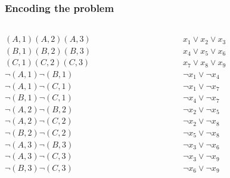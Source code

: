 \documentclass{beamer}
\begin{document}
\begin{frame}
\frametitle{Encoding the problem}
\begin{columns}
	\begin{column}{0.1\textwidth}
		\small
	$(A,1) (A,2) (A,3)$\\
	$(B,1) (B,2) (B,3)$\\
	$(C,1) (C,2) (C,3)$\\
	\vspace{1em}
	$ \neg (A,1)  \neg (B,1)$\\
	$ \neg (A,1)  \neg (C,1)$\\
	$ \neg (B,1)  \neg (C,1)$\\
	\vspace{1em}
	$ \neg (A,2)  \neg (B,2)$\\
	$ \neg (A,2)  \neg (C,2)$\\
	$ \neg (B,2)  \neg (C,2)$\\
	\vspace{1em}
	$ \neg (A,3)  \neg (B,3)$\\
	$ \neg (A,3)  \neg (C,3)$\\
	$ \neg (B,3)  \neg (C,3)$\\
	\end{column}
	\begin{column}{0.2\textwidth}  %
		\small
$ x_1 \lor  x_2 \lor x_3 $ \\
$x_4 \lor  x_5 \lor x_6 $ \\
$x_7 \lor  x_8 \lor x_9 $ \\
	\vspace{1em}
$ \neg x_1 \lor  \neg x_4 $ \\
$ \neg x_1 \lor  \neg x_7 $ \\
$ \neg x_4 \lor  \neg x_7 $ \\
	\vspace{1em}
$\neg x_2 \lor  \neg x_5 $ \\
$ \neg x_2 \lor  \neg x_8 $ \\
$ \neg x_5 \lor  \neg x_8 $ \\
	\vspace{1em}
$ \neg x_3 \lor  \neg x_6 $ \\
$ \neg x_3 \lor  \neg x_9 $ \\
$ \neg x_6 \lor  \neg x_9 $ \\
	\end{column}
\end{columns}


\end{frame}
\end{document}
